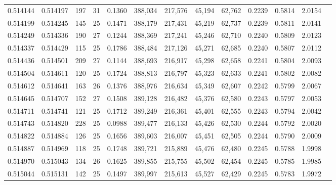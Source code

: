 \begin{tabular}{rrrrrrrrrrrrr}
0.514144 & 0.514197 & 197 &  31 &                                     0.1360 & 388,034 & 217,576 &  45,194 &  62,762 & 0.2239 & 0.5814 & 2.0154 \\
0.514199 & 0.514245 & 145 &  25 &                                     0.1471 & 388,179 & 217,431 &  45,219 &  62,737 & 0.2239 & 0.5811 & 2.0141 \\
0.514249 & 0.514336 & 190 &  27 &                                     0.1244 & 388,369 & 217,241 &  45,246 &  62,710 & 0.2240 & 0.5809 & 2.0123 \\
0.514337 & 0.514429 & 115 &  25 &                                     0.1786 & 388,484 & 217,126 &  45,271 &  62,685 & 0.2240 & 0.5807 & 2.0112 \\
0.514436 & 0.514501 & 209 &  27 &                                     0.1144 & 388,693 & 216,917 &  45,298 &  62,658 & 0.2241 & 0.5804 & 2.0093 \\
0.514504 & 0.514611 & 120 &  25 &                                     0.1724 & 388,813 & 216,797 &  45,323 &  62,633 & 0.2241 & 0.5802 & 2.0082 \\
0.514612 & 0.514641 & 163 &  26 &                                     0.1376 & 388,976 & 216,634 &  45,349 &  62,607 & 0.2242 & 0.5799 & 2.0067 \\
0.514645 & 0.514707 & 152 &  27 &                                     0.1508 & 389,128 & 216,482 &  45,376 &  62,580 & 0.2243 & 0.5797 & 2.0053 \\
0.514711 & 0.514741 & 121 &  25 &                                     0.1712 & 389,249 & 216,361 &  45,401 &  62,555 & 0.2243 & 0.5794 & 2.0042 \\
0.514743 & 0.514820 & 228 &  25 &                                     0.0988 & 389,477 & 216,133 &  45,426 &  62,530 & 0.2244 & 0.5792 & 2.0020 \\
0.514822 & 0.514884 & 126 &  25 &                                     0.1656 & 389,603 & 216,007 &  45,451 &  62,505 & 0.2244 & 0.5790 & 2.0009 \\
0.514887 & 0.514969 & 118 &  25 &                                     0.1748 & 389,721 & 215,889 &  45,476 &  62,480 & 0.2245 & 0.5788 & 1.9998 \\
0.514970 & 0.515043 & 134 &  26 &                                     0.1625 & 389,855 & 215,755 &  45,502 &  62,454 & 0.2245 & 0.5785 & 1.9985 \\
0.515044 & 0.515131 & 142 &  25 &                                     0.1497 & 389,997 & 215,613 &  45,527 &  62,429 & 0.2245 & 0.5783 & 1.9972 \\

\end{tabular}
